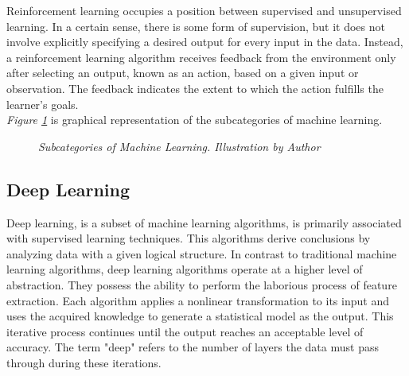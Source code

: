 Reinforcement learning occupies a position between supervised and unsupervised learning. In a certain sense, there is some form of supervision, but it does not involve explicitly specifying a desired output for every input in the data. Instead, a reinforcement learning algorithm receives feedback from the environment only after selecting an output, known as an action, based on a given input or observation. The feedback indicates the extent to which the action fulfills the learner's goals. \\

\textit{Figure \ref{fig:ml_branches}} is graphical representation of the subcategories of machine learning.

\begin{figure}[H]
\centering
{}
\caption[Subcategories of Machine Learning.]{\textit{Subcategories of Machine Learning. Illustration by Author}}
{\label{fig:ml_branches}}
\end{figure}


\subsection{Deep Learning}

Deep learning, is a subset of machine learning algorithms, is primarily associated with supervised learning techniques. This algorithms derive conclusions by analyzing data with a given logical structure. In contrast to traditional machine learning algorithms, deep learning algorithms operate at a higher level of abstraction. They possess the ability to perform the laborious process of feature extraction. Each algorithm applies a nonlinear transformation to its input and uses the acquired knowledge to generate a statistical model as the output. This iterative process continues until the output reaches an acceptable level of accuracy. The term "deep" refers to the number of layers the data must pass through during these iterations. \\

